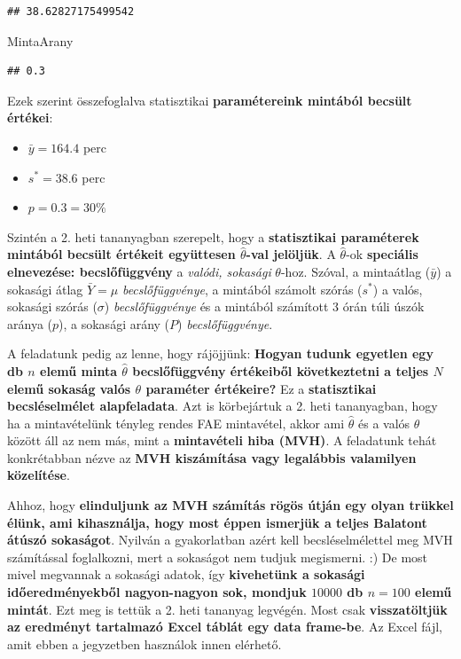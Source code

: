 \documentclass[
]{book}
\newenvironment{Shaded}{\begin{snugshade}}{\end{snugshade}}
\newcommand{\NormalTok}[1]{#1}
\providecommand{\tightlist}{%
  \setlength{\itemsep}{0pt}\setlength{\parskip}{0pt}}
\begin{document}
\begin{verbatim}
## 38.62827175499542
\end{verbatim}

\begin{Shaded}
\begin{Highlighting}[]
\NormalTok{MintaArany}
\end{Highlighting}
\end{Shaded}

\begin{verbatim}
## 0.3
\end{verbatim}

Ezek szerint összefoglalva statisztikai \textbf{paramétereink mintából becsült értékei}:

\begin{itemize}
\tightlist
\item
  \(\bar{y}=164.4\) perc
\item
  \(s^* = 38.6\) perc
\item
  \(p = 0.3=30\%\)
\end{itemize}

Szintén a 2. heti tananyagban szerepelt, hogy a \textbf{statisztikai paraméterek mintából becsült értékeit együttesen \(\hat{\theta}\)-val jelöljük}. A \(\hat{\theta}\)-ok \textbf{speciális elnevezése: becslőfüggvény} a \emph{valódi, sokasági} \(\theta\)-hoz. Szóval, a mintaátlag (\(\bar{y}\)) a sokasági átlag \(\bar{Y}=\mu\) \emph{becslőfüggvénye}, a mintából számolt szórás (\(s^*\)) a valós, sokasági szórás (\(\sigma\)) \emph{becslőfüggvénye} és a mintából számított 3 órán túli úszók aránya (\(p\)), a sokasági arány (\(P\)) \emph{becslőfüggvénye}.

A feladatunk pedig az lenne, hogy rájöjjünk: \textbf{Hogyan tudunk egyetlen egy db \(n\) elemű minta \(\hat{\theta}\) becslőfüggvény értékeiből következtetni a teljes \(N\) elemű sokaság valós \(\theta\) paraméter értékeire?} Ez a \textbf{statisztikai becsléselmélet alapfeladata}. Azt is körbejártuk a 2. heti tananyagban, hogy ha a mintavételünk tényleg rendes FAE mintavétel, akkor ami \(\hat{\theta}\) és a valós \(\theta\) között áll az nem más, mint a \textbf{mintavételi hiba (MVH)}. A feladatunk tehát konkrétabban nézve az \textbf{MVH kiszámítása vagy legalábbis valamilyen közelítése}.

Ahhoz, hogy \textbf{elinduljunk az MVH számítás rögös útján egy olyan trükkel élünk, ami kihasználja, hogy most éppen ismerjük a teljes Balatont átúszó sokaságot}. Nyilván a gyakorlatban azért kell becsléselmélettel meg MVH számítással foglalkozni, mert a sokaságot nem tudjuk megismerni. :) De most mivel megvannak a sokasági adatok, így \textbf{kivehetünk a sokasági időeredményekből nagyon-nagyon sok, mondjuk \(10000\) db \(n=100\) elemű mintát}.
Ezt meg is tettük a 2. heti tananyag legvégén. Most csak \textbf{visszatöltjük az eredményt tartalmazó Excel táblát egy data frame-be}. Az Excel fájl, amit ebben a jegyzetben használok innen elérhető.
\end{document}
